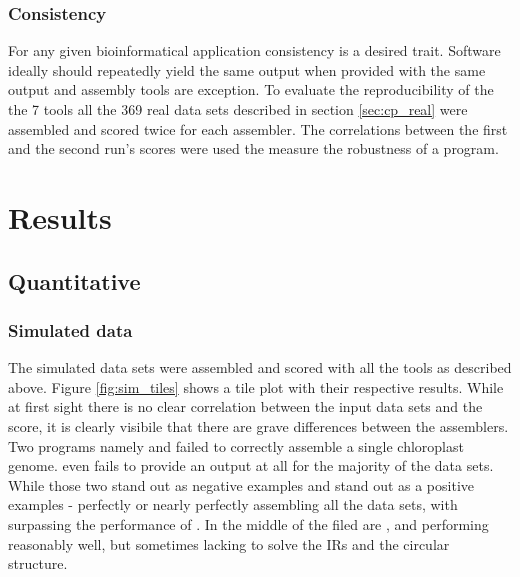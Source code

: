 \subsubsection{Consistency}
For any given bioinformatical application consistency is a desired trait. Software ideally should repeatedly
yield the same output when provided with the same output and assembly tools are exception.  To evaluate the
reproducibility of the the 7 tools all the 369 real data sets described in section \ref{sec:cp_real} were
assembled and scored twice for each assembler. The correlations between the first and the second run's scores
were used the measure the robustness of a program.

\section{Results} \label{results:ca}
\subsection{Quantitative}
\subsubsection{Simulated data}
\label{results:sim}

The simulated data sets were assembled and scored with all the tools as described above. Figure
\ref{fig:sim_tiles} shows a tile plot with their respective results. While at first sight there is no clear
correlation between the input data sets and the score, it is clearly visibile that there are grave differences between the
assemblers. Two programs namely \cassp \hspace{0.5ex} and \ioga \hspace{0.5ex} failed to correctly assemble a
single chloroplast genome. \ioga even fails to provide an output at all for the majority of the data sets. While
those two stand out as  negative examples \fp and \go stand out as a positive examples - perfectly or nearly
perfectly assembling all the data sets, with \go surpassing the performance of \fp. In the middle of the filed
are \ce, \oa and \np performing reasonably well, but sometimes lacking to solve the IRs and the circular
structure.



